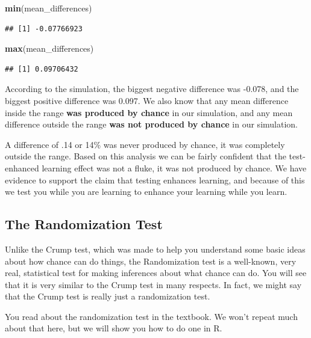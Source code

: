 \documentclass[]{book}
\newenvironment{Shaded}{\begin{snugshade}}{\end{snugshade}}
\newcommand{\KeywordTok}[1]{\textcolor[rgb]{0.13,0.29,0.53}{\textbf{#1}}}
\newcommand{\NormalTok}[1]{#1}
\begin{document}
\begin{Shaded}
\begin{Highlighting}[]
\KeywordTok{min}\NormalTok{(mean_differences)}
\end{Highlighting}
\end{Shaded}

\begin{verbatim}
## [1] -0.07766923
\end{verbatim}

\begin{Shaded}
\begin{Highlighting}[]
\KeywordTok{max}\NormalTok{(mean_differences)}
\end{Highlighting}
\end{Shaded}

\begin{verbatim}
## [1] 0.09706432
\end{verbatim}

According to the simulation, the biggest negative difference was -0.078,
and the biggest positive difference was 0.097. We also know that any
mean difference inside the range \textbf{was produced by chance} in our
simulation, and any mean difference outside the range \textbf{was not
produced by chance} in our simulation.

A difference of .14 or 14\% was never produced by chance, it was
completely outside the range. Based on this analysis we can be fairly
confident that the test-enhanced learning effect was not a fluke, it was
not produced by chance. We have evidence to support the claim that
testing enhances learning, and because of this we test you while you are
learning to enhance your learning while you learn.

\subsection{The Randomization Test}\label{the-randomization-test}

Unlike the Crump test, which was made to help you understand some basic
ideas about how chance can do things, the Randomization test is a
well-known, very real, statistical test for making inferences about what
chance can do. You will see that it is very similar to the Crump test in
many respects. In fact, we might say that the Crump test is really just
a randomization test.

You read about the randomization test in the textbook. We won't repeat
much about that here, but we will show you how to do one in R.
\end{document}
